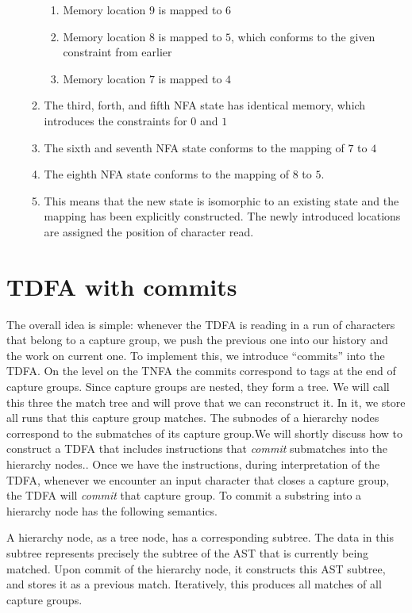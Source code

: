 \documentclass[english]{sigplanconf}
\theoremstyle{definition}
\begin{document}
\begin{enumerate}
\begin{enumerate}
\begin{enumerate}
\item Memory location $9$ is mapped to $6$
\item Memory location $8$ is mapped to $5$, which conforms to the given
constraint from earlier
\item Memory location $7$ is mapped to $4$
\end{enumerate}
\item The third, forth, and fifth NFA state has identical memory, which
introduces the constraints for $0$ and $1$
\item The sixth and seventh NFA state conforms to the mapping of $7$ to
$4$
\item The eighth NFA state conforms to the mapping of $8$ to $5$.
\item This means that the new state is isomorphic to an existing state and
the mapping has been explicitly constructed. The newly introduced
locations are assigned the position of character read.
\end{enumerate}
\end{enumerate}

\section{TDFA with commits\label{sec:TNFA-with-hierarchical}}

The overall idea is simple: whenever the TDFA is reading in a run
of characters that belong to a capture group, we push the previous
one into our history and the work on current one. To implement this,
we introduce ``commits'' into the TDFA. On the level on the TNFA
the commits correspond to tags at the end of capture groups. Since
capture groups are nested, they form a tree. We will call this three
the match tree and will prove that we can reconstruct it. In it, we
store all runs that this capture group matches. The subnodes of a
hierarchy nodes correspond to the submatches of its capture group.We
will shortly discuss how to construct a TDFA that includes instructions
that \emph{commit} submatches into the hierarchy nodes.. Once we have
the instructions, during interpretation of the TDFA, whenever we encounter
an input character that closes a capture group, the TDFA will \emph{commit}
that capture group. To commit a substring into a hierarchy node has
the following semantics.

A hierarchy node, as a tree node, has a corresponding subtree. The
data in this subtree represents precisely the subtree of the AST that
is currently being matched. Upon commit of the hierarchy node, it
constructs this AST subtree, and stores it as a previous match. Iteratively,
this produces all matches of all capture groups.
\end{document}
